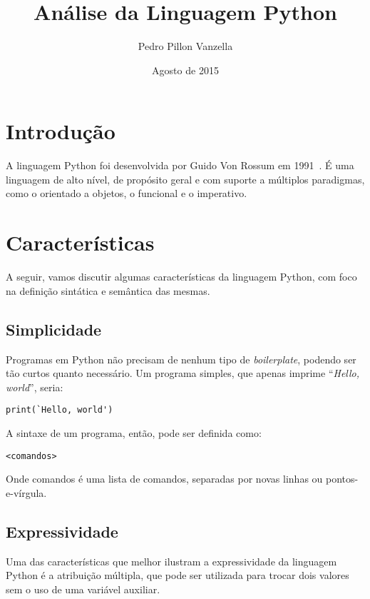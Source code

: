 \documentclass[12pt]{article}
\title{Análise da Linguagem Python}
\author{Pedro Pillon Vanzella}
\date{Agosto de 2015}
\begin{document}
 

\maketitle
     
\section{Introdução}\label{sec:introducao}

A linguagem Python foi desenvolvida por Guido Von Rossum em 1991~\cite{venners:2003}. É uma
linguagem de alto nível, de propósito geral e com suporte a múltiplos
paradigmas, como o orientado a objetos, o funcional e o imperativo.

\section{Características}\label{sec:caracteristicas}

A seguir, vamos discutir algumas características da linguagem Python, com foco
na definição sintática e semântica das mesmas.

\subsection{Simplicidade}\label{sec:simplicidade}

Programas em Python não precisam de nenhum tipo de \textit{boilerplate}, podendo
ser tão curtos quanto necessário. Um programa simples, que apenas imprime
``\textit{Hello, world}'', seria:

\begin{lstlisting}
print(`Hello, world')
\end{lstlisting}

A sintaxe de um programa, então, pode ser definida como:

\begin{lstlisting}
<comandos>
\end{lstlisting}

Onde \textsf{comandos} é uma lista de \textsf{comando}s, separadas por novas
linhas ou pontos-e-vírgula.

\subsection{Expressividade}\label{sec:expressividade}

Uma das características que melhor ilustram a expressividade da linguagem Python
é a atribuição múltipla, que pode ser utilizada para trocar dois valores sem o
uso de uma variável auxiliar.
\end{document}
